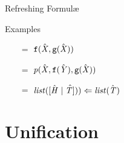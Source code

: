 \documentclass[presentation]{beamer}\mode<presentation>{\usetheme{AMSBolognaFC}}
\begin{document}
\begin{frame}[allowframebreaks]{Refreshing Formul\ae{}}
\begin{exampleblock}{Examples}
\begin{multicols}{2}
\begin{itemize}
				\item[$=$] $\mathtt{f}(\hat{\mathit{X}}, \mathtt{g}(\hat{\mathit{X}}))$
				\item[$=$] $\text{\textit{p}}(\hat{\mathit{X}}, \mathtt{f}(\hat{\mathit{Y}}), \mathtt{g}(\hat{\mathit{X}}))$
				\item[$=$] $\text{\textit{list}}([\hat{\mathit{H}} \mid \hat{\mathit{T} ]})) \Leftarrow \text{\textit{list}}(\hat{\mathit{T}})$
			\end{itemize}
		\end{multicols}
    \end{exampleblock}
\end{frame}

\section{Unification}
\end{document}
